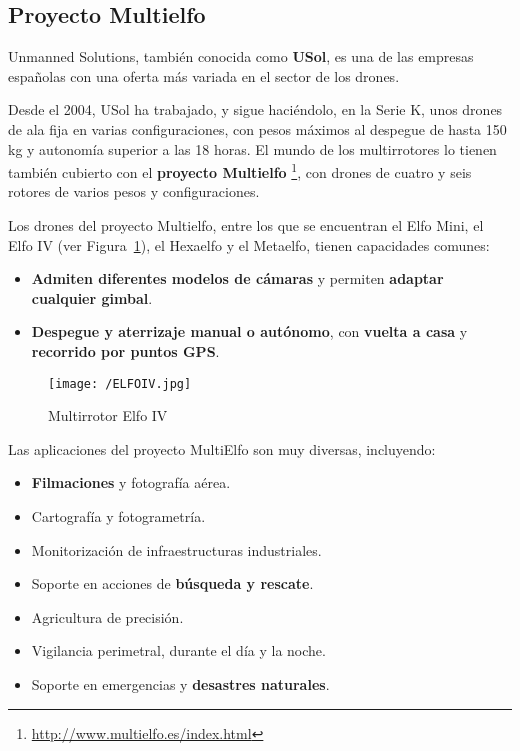 \subsection{Proyecto Multielfo}
\label{sec:usol}

Unmanned Solutions, también conocida como \textbf{USol}, es una de las empresas españolas con una oferta más variada en el sector de los drones. 

Desde el 2004, USol ha trabajado, y sigue haciéndolo, en la Serie K, unos drones de ala fija en varias configuraciones, con pesos máximos al despegue de hasta 150 kg y autonomía superior a las 18 horas. El mundo de los multirrotores lo tienen también cubierto con el \textbf{proyecto Multielfo} \footnote{\url{http://www.multielfo.es/index.html}}, con drones de cuatro y seis rotores de varios pesos y configuraciones.

Los drones del proyecto Multielfo, entre los que se encuentran el Elfo Mini, el Elfo IV (ver Figura~\ref{fig:elfoiv}), el Hexaelfo y el Metaelfo, tienen capacidades comunes:
\begin{itemize}
\item \textbf{Admiten diferentes modelos de cámaras} y permiten \textbf{adaptar cualquier gimbal}.
\item \textbf{Despegue y aterrizaje manual o autónomo}, con \textbf{vuelta a casa} y \textbf{recorrido por puntos \acs{GPS}}.
\end{itemize}

\begin{figure}[!h]
\begin{center}
\texttt{[image: /ELFOIV.jpg]}
\caption[Multirrotor Elfo IV]{Multirrotor Elfo IV}
\label{fig:elfoiv}
\end{center}
\end{figure}

Las aplicaciones del proyecto MultiElfo son muy diversas, incluyendo: 
\begin{itemize}
\item \textbf{Filmaciones} y fotografía aérea.
\item Cartografía y fotogrametría.
\item Monitorización de infraestructuras industriales.
\item Soporte en acciones de \textbf{búsqueda y rescate}.
\item Agricultura de precisión.
\item Vigilancia perimetral, durante el día y la noche.
\item Soporte en emergencias y \textbf{desastres naturales}.
\end{itemize}

